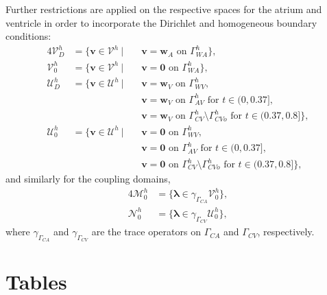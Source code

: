 \documentclass[3p]{elsarticle}
\begin{document}
Further restrictions are applied on the respective spaces for the atrium and ventricle
in order to incorporate the Dirichlet and homogeneous boundary conditions:
\begin{alignat}{4}
	\boldsymbol{\mathcal{V}}^h_D & = \{\boldsymbol{v} \in \boldsymbol{\mathcal{V}}^h
    ~|~&&\boldsymbol{v} = \boldsymbol{w}_A \text{ on } \Gamma_{WA}^h \}, \\
	\boldsymbol{\mathcal{V}}^h_0 & = \{\boldsymbol{v} \in \boldsymbol{\mathcal{V}}^h
    ~|~&&\boldsymbol{v} = \boldsymbol{0}   \text{ on } \Gamma_{WA}^h \}, \\
	\boldsymbol{\mathcal{U}}^h_D & = \{\boldsymbol{v} \in \boldsymbol{\mathcal{U}}^h
    ~|~&&\boldsymbol{v} = \boldsymbol{w}_V \text{ on } \Gamma_{WV}^h, \nonumber \\
    &&&\boldsymbol{v} = \boldsymbol{w}_V \text{ on } \Gamma_{AV}^h \text{ for } t \in (0, 0.37], \nonumber \\
    &&&\boldsymbol{v} = \boldsymbol{w}_V \text{ on } \Gamma_{CV}^h \setminus \Gamma_{CVo}^h \text{ for } t \in (0.37, 0.8] \}, \\
	\boldsymbol{\mathcal{U}}^h_0 & = \{\boldsymbol{v} \in \boldsymbol{\mathcal{U}}^h
    ~|~&&\boldsymbol{v} = \boldsymbol{0} \text{ on } \Gamma_{WV}^h, \nonumber \\
    &&&\boldsymbol{v} = \boldsymbol{0}    \text{ on } \Gamma_{AV}^h \text{ for } t \in (0, 0.37], \nonumber \\
    &&&\boldsymbol{v} = \boldsymbol{0}    \text{ on } \Gamma_{CV}^h \setminus \Gamma_{CVo}^h \text{ for } t \in (0.37, 0.8] \},
\end{alignat}
and similarly for the coupling domains,
\begin{alignat}{4}
	\boldsymbol{\mathcal{M}}^h_0 & = \{\boldsymbol{\lambda} \in \gamma_{\Gamma_{CA}} \boldsymbol{\mathcal{V}}^h_0 \}, \\
	\boldsymbol{\mathcal{N}}^h_0 & = \{\boldsymbol{\lambda} \in \gamma_{\Gamma_{CV}} \boldsymbol{\mathcal{U}}^h_0 \},
\end{alignat}
where $\gamma_{\Gamma_{CA}}$ and $\gamma_{\Gamma_{CV}}$ are the trace operators
on $\Gamma_{CA}$ and $\Gamma_{CV}$, respectively.


\section{Tables}

\FloatBarrier
\end{document}
